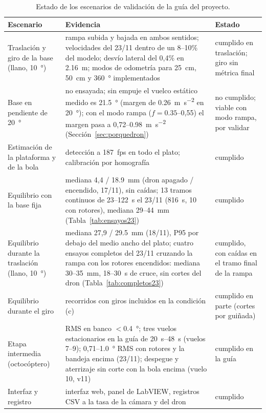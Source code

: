 \begin{table}[!htbp]
\centering
\caption{Estado de los escenarios de validación de la guía del proyecto.}
\label{tab:req}
\footnotesize
\renewcommand{\arraystretch}{1.1}
\begin{tabularx}{\textwidth}{@{}>{\raggedright\arraybackslash}p{}>{\raggedright\arraybackslash}X>{\raggedright\arraybackslash}p{}@{}}
\toprule
Escenario & Evidencia & Estado \\
\midrule
Traslación y giro de la base (llano, \SI{10}{\degree}) & rampa subida y bajada en ambos sentidos; velocidades del 23/11 dentro de un 8--10\% del modelo; desvío lateral del 0,4\% en \SI{2.16}{\metre}; modos de odometría para \SI{25}{\centi\metre}, \SI{50}{\centi\metre} y \SI{360}{\degree} implementados & cumplido en traslación; giro sin métrica final \\
Base en pendiente de \SI{20}{\degree} & no ensayada; sin empuje el vuelco estático medido es \SI{21.5}{\degree} (margen de \SI{0.26}{\metre\per\second\squared} en \SI{20}{\degree}); con el modo rampa ($f=0.35$--0,55) el margen pasa a 0,72--\SI{0.98}{\metre\per\second\squared} (Sección~\ref{sec:porquedron}) & no cumplido; viable con modo rampa, por validar \\
Estimación de la plataforma y de la bola & detección a \SI{187}{fps} en todo el plato; calibración por homografía & cumplido \\
Equilibrio con la base fija & mediana 4,4 / \SI{18.9}{\milli\metre} (dron apagado / encendido, 17/11), sin caídas; 13 tramos continuos de 23--\SI{122}{\second} el 23/11 (\SI{816}{\second}, 10 con rotores), mediana 29--\SI{44}{\milli\metre} (Tabla~\ref{tab:ensayos23}) & cumplido \\
Equilibrio durante la traslación (llano, \SI{10}{\degree}) & mediana 27,9 / \SI{29.5}{\milli\metre} (18/11), P95 por debajo del medio ancho del plato; cuatro ensayos completos del 23/11 cruzando la rampa con los rotores encendidos: mediana 30--\SI{35}{\milli\metre}, 18--\SI{30}{\second} de cruce, sin cortes del dron (Tabla~\ref{tab:completos23}) & cumplido, con caídas en el tramo final de la rampa \\
Equilibrio durante el giro & recorridos con giros incluidos en la condición (c) & cumplido en parte (cortes por guiñada) \\
Etapa intermedia (octocóptero) & RMS en banco $<$\SI{0.4}{\degree}; tres vuelos estacionarios en la guía de \SIrange{20}{48}{\second} (vuelos 7--9); 0,71--\SI{1.0}{\degree} RMS con rotores y la bandeja encima (23/11); despegue y aterrizaje sin corte con la bola encima (vuelo 10, v11) & cumplido en la guía \\
Interfaz y registro & interfaz web, panel de LabVIEW, registros CSV a la tasa de la cámara y del dron & cumplido \\
\bottomrule
\end{tabularx}
\end{table}

